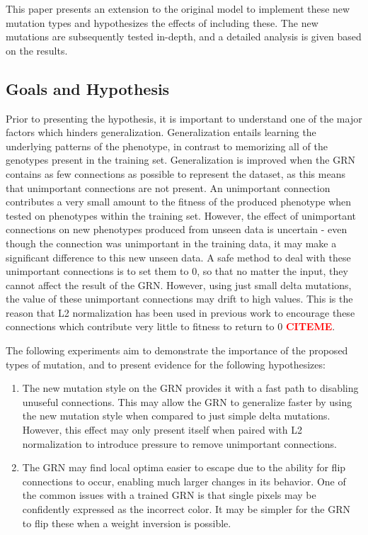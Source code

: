 \documentclass[twocolumn,a4paper,11pt]{article}
\newcommand{\citeme}{\textbf{\textcolor{red}{CITEME}}}
\begin{document}
    This paper presents an extension to the original model to implement these new mutation types and hypothesizes the effects of including these. The new mutations are subsequently tested in-depth, and a detailed analysis is given based on the results.

    \subsection{Goals and Hypothesis}
    Prior to presenting the hypothesis, it is important to understand one of the major factors which hinders generalization. Generalization entails learning the underlying patterns of the phenotype, in contrast to memorizing all of the genotypes present in the training set. Generalization is improved when the GRN contains as few connections as possible to represent the dataset, as this means that unimportant connections are not present. An unimportant connection contributes a very small amount to the fitness of the produced phenotype when tested on phenotypes within the training set. However, the effect of unimportant connections on new phenotypes produced from unseen data is uncertain - even though the connection was unimportant in the training data, it may make a significant difference to this new unseen data. A safe method to deal with these unimportant connections is to set them to 0, so that no matter the input, they cannot affect the result of the GRN. However, using just small delta mutations, the value of these unimportant connections may drift to high values. This is the reason that L2 normalization has been used in previous work to encourage these connections which contribute very little to fitness to return to 0 \citeme.

    The following experiments aim to demonstrate the importance of the proposed types of mutation, and to present evidence for the following hypothesizes:

    \begin{enumerate}
        \item The new mutation style on the GRN provides it with a fast path to disabling unuseful connections. This may allow the GRN to generalize faster by using the new mutation style when compared to just simple delta mutations. However, this effect may only present itself when paired with L2 normalization to introduce pressure to remove unimportant connections.
        \item The GRN may find local optima easier to escape due to the ability for flip connections to occur, enabling much larger changes in its behavior. One of the common issues with a trained GRN is that single pixels may be confidently expressed as the incorrect color. It may be simpler for the GRN to flip these when a weight inversion is possible.
    \end{enumerate}
\end{document}
